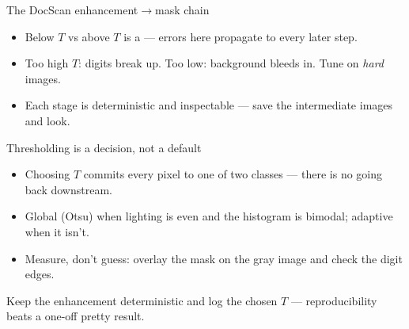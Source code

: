 \documentclass[10pt,aspectratio=169]{beamer}
\begin{document}
\begin{frame}{The DocScan enhancement$\rightarrow$mask chain}
  \begin{center}
  \end{center}
  \begin{itemize}
    \item Below $T$ vs above $T$ is a  — errors here propagate to every later step.
    \item Too high $T$: digits break up. Too low: background bleeds in. Tune on \emph{hard} images.
    \item Each stage is deterministic and inspectable — save the intermediate images and look.
  \end{itemize}
\end{frame}

\begin{frame}{Thresholding is a decision, not a default}
  \begin{itemize}
    \item Choosing $T$ commits every pixel to one of two classes — there is no going back downstream.
    \item Global (Otsu) when lighting is even and the histogram is bimodal; adaptive when it isn't.
    \item Measure, don't guess: overlay the mask on the gray image and check the digit edges.
  \end{itemize}
  \begin{goodbox}
    Keep the enhancement deterministic and log the chosen $T$ — reproducibility beats a one-off pretty result.
  \end{goodbox}
\end{frame}
\end{document}
